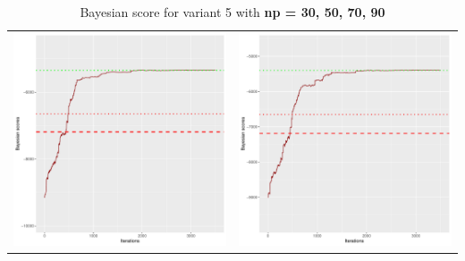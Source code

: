 \documentclass[]{scrartcl}
\begin{document}
\begin{table}[h!]
\begin{tabular}{cc}
\includegraphics[scale = 0.4]{./figs/alarm/v5/70/bayBoundsEvolution-3502.pdf} & 
\includegraphics[scale = 0.4]{./figs/alarm/v5/90/bayBoundsEvolution-3502.pdf} \\
\end{tabular}
\caption{Bayesian score for variant 5 with \textbf{np =  30, 50, 70, 90 }}
\end{table}
\end{document}
